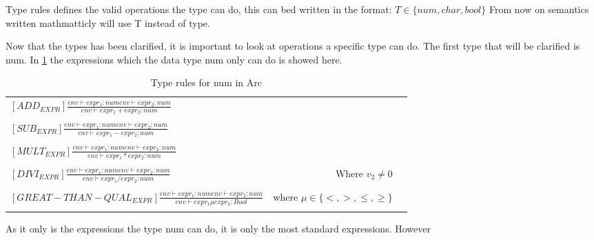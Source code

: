 Type rules defines the valid operations the type can do, this can bed written in the format:
$T \in \{num, char, bool\}$
From now on semantics written mathmatticly will use T instead of type.

Now that the types has been clarified, it is important to look at operations a specific type can do.
The first type that will be clarified is num.
In \ref{tab:num-rules} the expressions which the data type num only can do is showed here.

\begin{table}[htb!]
    \centering
    \begin{tabular}{lr>{\raggedright\arraybackslash}p{6cm}}
        $[ADD_{EXPR}] \frac
            {env\vdash expr_1: num env\vdash expr_2: num}
            {env\vdash expr_1 +expr_2: num}$
        \\
        \\
        $[SUB_{EXPR}] \frac
            {env\vdash expr_1: num env\vdash expr_2: num}
            {env\vdash expr_1 -expr_2: num}$
        \\
        \\
        $[MULT_{EXPR}] \frac
            {env\vdash expr_1: num env\vdash expr_2: num}
            {env\vdash expr_1 *expr_2: num}$
        \\
        \\
        $[DIVI_{EXPR}] \frac
            {env\vdash expr_1: num env\vdash expr_2: num}
        {env\vdash expr_1 /expr_2: num}$ & Where $v_2 \neq 0$
        \\
        \\
        $[GREAT-THAN-QUAL_{EXPR}] \frac
            {env\vdash expr_1: num env\vdash expr_2: num}
            {env\vdash expr_1 \mu expr_2: Bool}$ & where $\mu \in \{<, >, \leq, \geq\}$
        \\
        \\
    \end{tabular}
    \caption{Type rules for num in Arc}
    \label{tab:num-rules}
\end{table}
As it only is the expressions the type num can do, it is only the most standard expressions.
However
